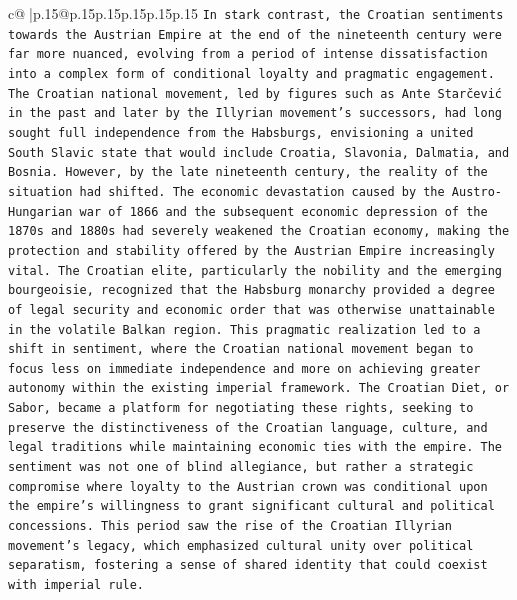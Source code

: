 \documentclass{article}
\begin{document}
{\begin{supertabular}{c@{$\;$}|p{.15\linewidth}@{}p{.15\linewidth}p{.15\linewidth}p{.15\linewidth}p{.15\linewidth}p{.15\linewidth}}
{{{\texttt{In stark contrast, the Croatian sentiments towards the Austrian Empire at the end of the nineteenth century were far more nuanced, evolving from a period of intense dissatisfaction into a complex form of conditional loyalty and pragmatic engagement. The Croatian national movement, led by figures such as Ante Starčević in the past and later by the Illyrian movement's successors, had long sought full independence from the Habsburgs, envisioning a united South Slavic state that would include Croatia, Slavonia, Dalmatia, and Bosnia. However, by the late nineteenth century, the reality of the situation had shifted. The economic devastation caused by the Austro{-}Hungarian war of 1866 and the subsequent economic depression of the 1870s and 1880s had severely weakened the Croatian economy, making the protection and stability offered by the Austrian Empire increasingly vital. The Croatian elite, particularly the nobility and the emerging bourgeoisie, recognized that the Habsburg monarchy provided a degree of legal security and economic order that was otherwise unattainable in the volatile Balkan region. This pragmatic realization led to a shift in sentiment, where the Croatian national movement began to focus less on immediate independence and more on achieving greater autonomy within the existing imperial framework. The Croatian Diet, or Sabor, became a platform for negotiating these rights, seeking to preserve the distinctiveness of the Croatian language, culture, and legal traditions while maintaining economic ties with the empire. The sentiment was not one of blind allegiance, but rather a strategic compromise where loyalty to the Austrian crown was conditional upon the empire's willingness to grant significant cultural and political concessions. This period saw the rise of the Croatian Illyrian movement's legacy, which emphasized cultural unity over political separatism, fostering a sense of shared identity that could coexist with imperial rule.} \\
\\ 
}}}
\end{supertabular}}
\end{document}
